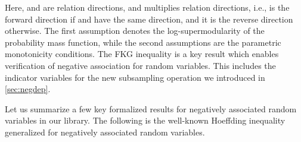 \documentclass[a4paper,UKenglish,cleveref, autoref, thm-restate]{lipics-v2021}
\begin{document}
Here, \isa{\isasymsigma} and \isa{\isasymtau} are relation directions, and \isa{\isasymsigma\ \isacharasterisk\ \isasymtau} multiplies relation directions, i.e., \isa{\isasymsigma\ \isacharasterisk\ \isasymtau} is the forward direction if \isa{\isasymsigma} and \isa{\isasymtau} have the same direction, and it is the reverse direction otherwise.
The first assumption denotes the log-supermodularity of the probability mass function, while the second assumptions are the parametric monotonicity conditions.
The FKG inequality is a key result which enables verification of negative association for random variables.
This includes the indicator variables for the new subsampling operation we introduced in \cref{sec:negdep}.

Let us summarize a few key formalized results for negatively associated random variables in our library.
The following is the well-known Hoeffding inequality~\cite{hoeffding1963} generalized for negatively associated random variables.
\end{document}

